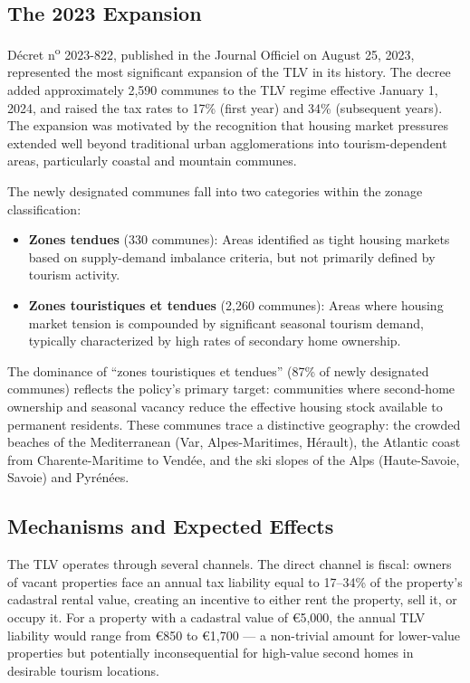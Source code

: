 \documentclass[12pt]{article}
\begin{document}
\subsection{The 2023 Expansion}

D\'ecret n\textsuperscript{o} 2023-822, published in the Journal Officiel on August 25, 2023, represented the most significant expansion of the TLV in its history. The decree added approximately 2,590 communes to the TLV regime effective January 1, 2024, and raised the tax rates to 17\% (first year) and 34\% (subsequent years). The expansion was motivated by the recognition that housing market pressures extended well beyond traditional urban agglomerations into tourism-dependent areas, particularly coastal and mountain communes.

The newly designated communes fall into two categories within the zonage classification:
\begin{itemize}
    \item \textbf{Zones tendues} (330 communes): Areas identified as tight housing markets based on supply-demand imbalance criteria, but not primarily defined by tourism activity.
    \item \textbf{Zones touristiques et tendues} (2,260 communes): Areas where housing market tension is compounded by significant seasonal tourism demand, typically characterized by high rates of secondary home ownership.
\end{itemize}

The dominance of ``zones touristiques et tendues'' (87\% of newly designated communes) reflects the policy's primary target: communities where second-home ownership and seasonal vacancy reduce the effective housing stock available to permanent residents. These communes trace a distinctive geography: the crowded beaches of the Mediterranean (Var, Alpes-Maritimes, H\'erault), the Atlantic coast from Charente-Maritime to Vend\'ee, and the ski slopes of the Alps (Haute-Savoie, Savoie) and Pyr\'en\'ees.

\subsection{Mechanisms and Expected Effects}

The TLV operates through several channels. The direct channel is fiscal: owners of vacant properties face an annual tax liability equal to 17--34\% of the property's cadastral rental value, creating an incentive to either rent the property, sell it, or occupy it. For a property with a cadastral value of \euro{5,000}, the annual TLV liability would range from \euro{850} to \euro{1,700} --- a non-trivial amount for lower-value properties but potentially inconsequential for high-value second homes in desirable tourism locations.
\end{document}
